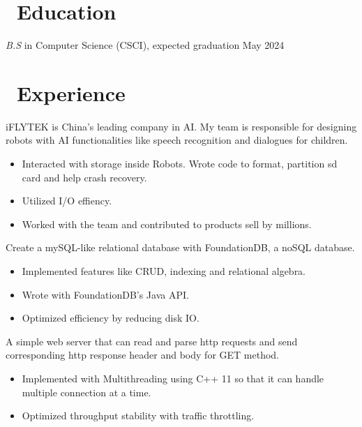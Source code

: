 \documentclass{resume}
\begin{document}



\section{\faGraduationCap\ Education}
\textit{B.S} in Computer Science (CSCI), expected graduation May 2024

\section{\faUsers\ Experience}
  iFLYTEK is China's leading company in AI. My team is responsible for designing robots with AI functionalities like speech recognition and dialogues for children.
\begin{itemize}
  \item Interacted with storage inside Robots. Wrote code to format, partition sd card and help crash recovery.
  \item Utilized I/O effiency.
  \item Worked with the team and contributed to products sell by millions.
\end{itemize}

  Create a mySQL-like relational database with FoundationDB, a noSQL database.
\begin{itemize}
  \item Implemented features like CRUD, indexing and relational algebra.
  \item Wrote with FoundationDB's Java API.
  \item Optimized efficiency by reducing disk IO.
\end{itemize}

  A simple web server that can read and parse http requests and send corresponding http response header and body for GET method.
\begin{itemize}
  \item Implemented with Multithreading using C++ 11 so that it can handle multiple connection at a time.
  \item Optimized throughput stability with traffic throttling.
\end{itemize}
\end{document}
